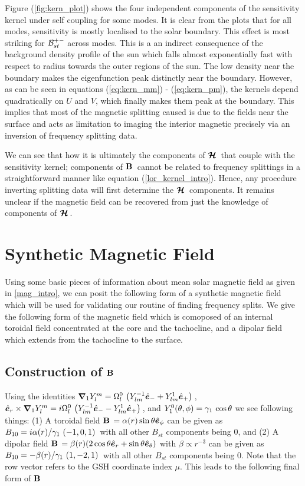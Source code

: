 Figure (\ref{fig:kern_plot}) shows the four independent components of the sensitivity kernel under self coupling for some modes. It is clear from the plots that for all modes, sensitivity is mostly localised to the solar boundary. This effect is most striking for $\mathcal{B}^{+-}_{st}$ across modes. This is a an indirect consequence of the background density profile of the sun which falls almost exponentially fast with respect to radius towards the outer regions of the sun. The low density near the boundary makes the eigenfunction peak distinctly near the boundary. However, as can be seen in equations (\ref{eq:kern_mm}) - (\ref{eq:kern_pm}), the kernels depend quadratically on $U$ and $V$, which finally makes them peak at the boundary. This implies that most of the magnetic splitting caused is due to the fields near the surface and acts as limitation to imaging the interior magnetic precisely via an inversion of frequency splitting data.

We can see that how it is ultimately the components of $\bm{\mathcal{H}}\,$ that couple with the sensitivity kernel; components of $\mathbf{B}\,$ cannot be related to frequency splittings in a straightforward manner like equation (\ref{lor_kernel_intro}). Hence, any procedure inverting splitting data will first determine the $\bm{\mathcal{H}}\,$ components. It remains unclear if the magnetic field can be recovered from just the knowledge of components of $\bm{\mathcal{H}}\,$.

\section{Synthetic Magnetic Field}
Using some basic pieces of information about mean solar magnetic field as given in \ref{mag_intro}, we can posit the following form of a synthetic magnetic field which will be used for validating our routine of finding frequency splits. We give the following form of the magnetic field which is comoposed of an internal toroidal field concentrated at the core and the tachocline, and a dipolar field which extends from the tachocline to the surface.

\subsection{Construction of $\mathbf{B}\,$}\label{sec:B_construction}
Using the identities $\bm{\nabla}_1 Y_l^m = \Omega_{l}^{0}\, \left( Y_{lm}^{-1} \hat{\bm{e}}_{-} + Y_{lm}^{1} \hat{\bm{e}}_{+} \right)\,$, $\hat{\bm{e}}_{r} \times\bm{\nabla}_1 Y_l^m = i\Omega_{l}^{0}\, \left( Y_{lm}^{-1} \hat{\bm{e}}_{-} - Y_{lm}^{1} \hat{\bm{e}}_{+} \right)\,$, and $Y_1^0(\theta,\phi) = \gamma_{1}\,\cos\theta$ we see following things: (1) A toroidal field $\mathbf{B}\, = \alpha(r) \sin\theta \hat{\bm{e}}_{\phi}$ can be given as $B_{10} = i \alpha(r) / \gamma_{1}\, \left( -1,0,1 \right)\,$ with all other $B_{st}$ components being $0$, and (2) A dipolar field $\mathbf{B}\, = \beta(r) (2\cos\theta \hat{\bm{e}}_{r} + \sin\theta\hat{\bm{e}}_{\theta})$ with $\beta \propto r^{-3}$ can be given as $B_{10} = -\beta(r)/\gamma_{1}\, \left( 1,-2,1 \right)\,$ with all other $B_{st}$ components being $0$. Note that the row vector refers to the GSH coordinate index $\mu$. This leads to the following final form of $\mathbf{B}\,$

